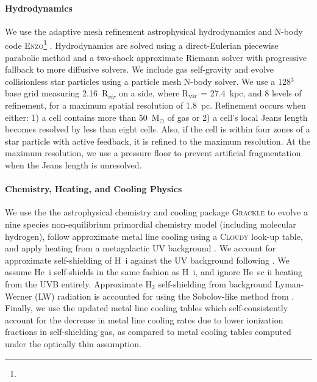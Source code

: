 \documentclass[twocolumn]{aastex61}
\begin{document}
\paragraph{Hydrodynamics} We use the adaptive mesh refinement astrophysical hydrodynamics and N-body code \textsc{Enzo}\footnote{} \citep{Enzo2014}. Hydrodynamics are solved using a direct-Eulerian piecewise parabolic method and a two-shock approximate Riemann solver with progressive fallback to more diffusive solvers. We include gas self-gravity and evolve collisionless star particles using a particle mesh N-body solver. We use a 128$^{3}$ base grid measuring 2.16~R$_{vir}$ on a side, where R$_{\rm vir}$ = 27.4~kpc, and 8 levels of refinement, for a maximum spatial resolution of 1.8~pc. Refinement occurs when either: 1) a cell contains more than 50~M$_{\odot}$ of gas
    or
2) a cell's local Jeans length becomes resolved by less than eight cells. Also, if the cell is within four zones of a star particle with active feedback, it is refined to the maximum resolution. At the maximum resolution, we use a pressure floor to prevent artificial fragmentation when the Jeans length is unresolved.

\paragraph{Chemistry, Heating, and Cooling Physics} We use the the astrophysical chemistry and cooling package \textsc{Grackle} \citep{GrackleMethod} to evolve a nine species non-equilibrium primordial chemistry model (including molecular hydrogen), follow approximate metal line cooling using a \textsc{Cloudy} look-up table, and apply heating from a metagalactic UV background \citep{HM2012}. We account for approximate self-shielding of H~{\sc i} against the UV background following \cite{Rahmati2013}. We assume He~{\sc i} self-shields in the same fashion as H~{\sc i}, and ignore He~{sc ii} heating from the UVB entirely. Approximate H$_2$ self-shielding from background Lyman-Werner (LW) radiation is accounted for using the Sobolov-like method from \cite{Wolcott-Green2011}. Finally, we use the updated metal line cooling tables which self-consistently account for the decrease in metal line cooling rates due to lower ionization fractions in self-shielding gas, as compared to metal cooling tables computed under the optically thin assumption.

\end{document}
